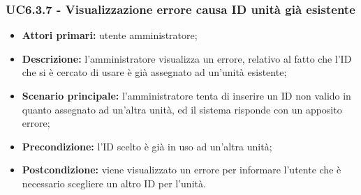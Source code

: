 \subsubsection{UC6.3.7 - Visualizzazione errore causa ID unità già esistente}
	\begin{itemize}
		\item \textbf{Attori primari:} utente amministratore;
		\item \textbf{Descrizione:} l'amministratore visualizza un errore, relativo al fatto che l'ID che si è cercato di usare è già assegnato ad un'unità esistente;
		\item \textbf{Scenario principale:} l'amministratore tenta di inserire un ID non valido in quanto assegnato ad un'altra unità, ed il sistema risponde con un apposito errore;
		\item \textbf{Precondizione:} l'ID scelto è già in uso ad un'altra unità;
		\item \textbf{Postcondizione:} viene visualizzato un errore per informare l'utente che è necessario scegliere un altro ID per l'unità.
	\end{itemize}